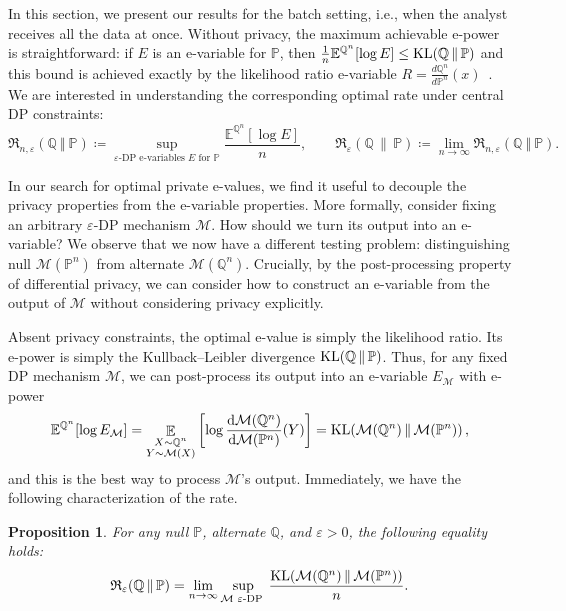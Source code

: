 \documentclass{article}
\DeclareMathOperator{\KLop}{KL}
\newcommand{\KL}[2]{%
  \mathchoice
    {\KLop\!\left(#1\,\middle\|\,#2\right)}%
    {\KLop(#1\,\Vert\,#2)}%
    {\KLop(#1\,\Vert\,#2)}%
    {\KLop(#1\,\Vert\,#2)}%
}
\newcommand{\Rdiv}[3][\eps]{%
  \mathfrak{R}_{#1}\!\left(#2\,\middle\|\,#3\right)%
}
\newcommand{\Null}{\mathbb{P}}
\newcommand{\E}{\mathbb{E}}
\newcommand{\Alt}{\mathbb{Q}}
\newcommand{\M}{\mathcal{M}}
\newcommand{\eps}{\varepsilon}
\newcommand{\cM}{\mathcal{M}}
\newtheorem{proposition}{Proposition}[section]
\begin{document}
In this section, we present our results for the batch setting, i.e., when the analyst receives all the data at once.
Without privacy, the maximum achievable e-power is straightforward: if $E$ is an e-variable for $\Null$, then $\frac{1}{n}\E^{\Alt^n}[\log E] \leq \KL{\Alt}{\Null}$ and this bound is achieved exactly by the likelihood ratio e-variable $R = \frac{d\Alt^n}{d\Null^n}(x)$~\citep{ramdasHypothesisTestingEvalues}. We are interested in understanding the corresponding optimal rate under central DP constraints:
\begin{equation}
    \mathfrak{R}_{n,\eps}(\Alt~\Vert~\Null) \coloneq \sup_{\varepsilon\text{-DP e-variables } E \text{ for }\Null} \frac{\E^{\Alt^n}[\log E]}{n},\qquad
    \Rdiv{\Alt}{\Null} \coloneq \lim_{n\to\infty} \mathfrak{R}_{n,\eps}(\Alt~\Vert~\Null).
    \label{eq:rate_def}
\end{equation}


In our search for optimal private e-values, we find it useful to decouple the privacy properties from the e-variable properties. 
More formally, consider fixing an arbitrary $\eps$-DP mechanism $\cM$.
How should we turn its output into an e-variable?
We observe that we now have a different testing problem: distinguishing null $\cM(\Null^n)$ from alternate $\M(\Alt^n)$.
Crucially, by the post-processing property of differential privacy, we can consider how to construct an e-variable from the output of $\M$ without considering privacy explicitly.

Absent privacy constraints, the optimal e-value is simply the likelihood ratio. 
Its e-power is simply the Kullback--Leibler divergence $\KL{\Alt}{\Null}$.
Thus, for any fixed DP mechanism $\M$, we can post-process its output into an e-variable $E_\M$ with e-power
\[
    \mathbb{E}^{\Alt^n}[\log E_\M] 
= \mathop{\mathbb{E}}\limits_{\substack{
  X \sim \Alt^n \\
  Y \sim \cM(X)
}}\left[\log \frac{\mathrm{d}\M(\Alt^n)}{\mathrm{d}\M(\Null^n)}(Y) \right] 
= \KL{\M(\Alt^n)}{\M(\Null^n)},
\]
and this is the best way to process $\M$'s output.
Immediately, we have the following characterization of the rate.

\begin{proposition}\label{prop:characterization}
For any null $\Null$, alternate $\Alt$, and $\varepsilon > 0$, the following equality holds:
\[\Rdiv{\Alt}{\Null} = \lim_{n \to \infty} \sup_{\M \hspace{.1cm}\eps\text{-DP }}  \frac{\KL{\M(\Alt^n)}{\M(\Null^n)}}{n}.\]
\end{proposition}
\end{document}
